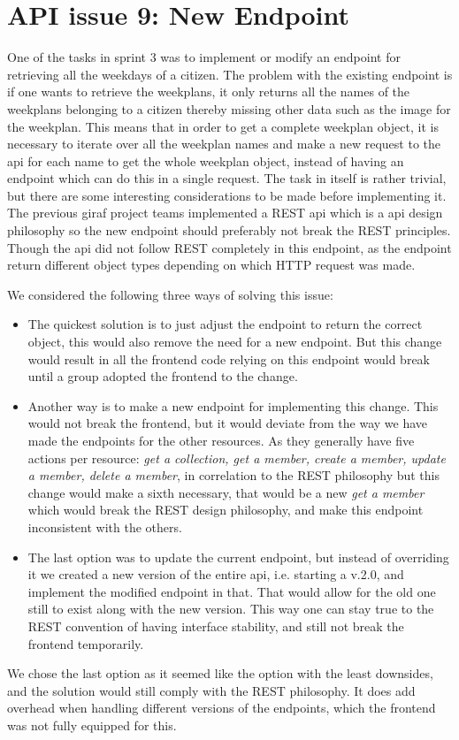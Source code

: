 \section{API issue 9: New Endpoint} \label{sec:webIssue9}

One of the tasks in sprint 3 was to implement or modify an endpoint for retrieving all the weekdays of a citizen. The problem with the existing endpoint is if one wants to retrieve the weekplans, it only returns all the names of the weekplans belonging to a citizen thereby missing other data such as the image for the weekplan. This means that in order to get a complete weekplan object, it is necessary to iterate over all the weekplan names and make a new request to the api for each name to get the whole weekplan object, instead of having an endpoint which can do this in a single request. 
The task in itself is rather trivial, but there are some interesting considerations to be made before implementing it. The previous \gls{giraf} project teams implemented a REST \gls{api} which is a \gls{api} design philosophy so the new endpoint should preferably not break the REST principles. Though the \gls{api} did not follow REST completely in this endpoint, as the endpoint return different object types depending on which HTTP request was made. 

We considered the following three ways of solving this issue:
\begin{itemize}
\item The quickest solution is to just adjust the endpoint to return the correct object, this would also remove the need for a new endpoint. But this change would result in all the frontend code relying on this endpoint would break until a group adopted the frontend to the change.
\item Another way is to make a new endpoint for implementing this change. This would not break the frontend, but it would deviate from the way we have made the endpoints for the other resources. As they generally have five actions per resource: \textit{get a collection, get a member, create a member, update a member, delete a member},  in correlation to the REST philosophy but this change would make a sixth necessary, that would be a new \textit{get a member} which would break the REST design philosophy, and make this endpoint inconsistent with the others.
\item The last option was to update the current endpoint, but instead of overriding it we created a new version of the entire \gls{api}, i.e. starting a v.2.0, and implement the modified endpoint in that. That would allow for the old one still to exist along with the new version. This way one can stay true to the REST convention of having interface stability, and still not break the frontend temporarily.
\end{itemize}

We chose the last option as it seemed like the option with the least downsides, and the solution would still comply with the REST philosophy. It does add overhead when handling different versions of the endpoints, which the frontend was not fully equipped for this.
